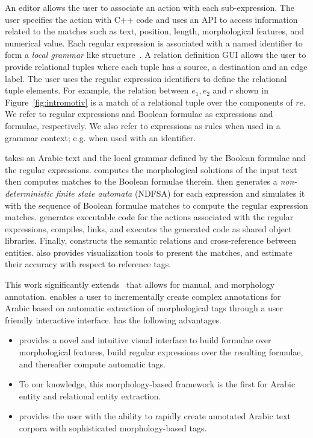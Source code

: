 An editor allows the user to associate an action with each sub-expression.
The user specifies the action with C++ code and uses an API to access information 
related to the matches such as text, position, length, morphological features, 
and numerical value.
%
Each regular expression is associated with a named identifier to form a 
{\em local grammar} like structure~\cite{traboulsi2009arabic}. 
%
A relation definition GUI allows the user to provide relational tuples 
where each tuple has a 
source, a destination and an edge label.
The user uses the regular expression identifiers to define the relational 
tuple elements.
For example, the relation between $e_1, e_2$ and $r$ shown in 
Figure~\ref{fig:intromotiv} is a match of a relational tuple 
over the components of $re$. 
%
We refer to regular expressions and Boolean formulae as expressions and formulae, respectively.
We also refer to expressions as rules
when used in a grammar context; e.g.  when used with an identifier. 

\framework takes an Arabic text and the local grammar defined by the 
Boolean formulae and the regular expressions.
\framework computes the morphological solutions of the 
input text then computes matches to the Boolean formulae therein.
\framework then generates a {\em non-deterministic finite state 
automata} (NDFSA) for each expression and simulates it with the 
sequence of Boolean formulae matches to compute the regular 
expression matches. 
\framework generates executable code for the actions associated with
the regular expressions, 
compiles, links, and executes the generated code 
as shared object libraries.
Finally, \framework constructs the semantic relations and 
cross-reference between entities.
\framework also provides visualization tools to present the matches, 
and estimate their accuracy with respect to reference tags.

This work significantly extends~\cite{JaZaMatar} 
that allows for manual, and morphology annotation.
\framework enables a user to incrementally create 
complex annotations for Arabic based on automatic 
extraction of morphological tags through a user friendly interactive interface. 
\framework has the following advantages.
\begin{itemize}
  \item \framework provides a novel and intuitive visual interface to build formulae over morphological features, 
    build regular expressions over the resulting formulae, and thereafter compute automatic tags.
  \item To our knowledge, this morphology-based framework is the first for Arabic entity and relational entity extraction.
  \item \framework provides the user with the ability to rapidly create annotated Arabic text corpora with sophisticated morphology-based tags.
\end{itemize}


